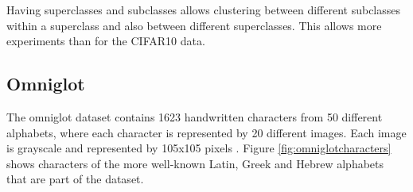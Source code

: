 Having superclasses and subclasses allows clustering between different subclasses within a superclass and also between different superclasses. This allows more experiments than for the CIFAR10 data.

\subsection{Omniglot}

The omniglot dataset contains 1623 handwritten characters from 50 different alphabets, where each character is represented by 20 different images. Each image is grayscale and represented by 105x105 pixels \cite{Lake1332}. Figure \ref{fig:omniglotcharacters} shows characters of the more well-known Latin, Greek and Hebrew alphabets that are part of the dataset.

